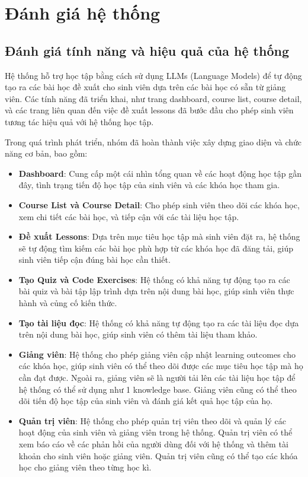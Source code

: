 \chapter{Đánh giá hệ thống}

\section{Đánh giá tính năng và hiệu quả của hệ thống}

Hệ thống hỗ trợ học tập bằng cách sử dụng LLMs (Language Models) để tự động tạo ra các bài học đề xuất cho sinh viên dựa trên các bài học có sẵn từ giảng viên. Các tính năng đã triển khai, như trang dashboard, course list, course detail, và các trang liên quan đến việc đề xuất lessons đã bước đầu cho phép sinh viên tương tác hiệu quả với hệ thống học tập.

Trong quá trình phát triển, nhóm đã hoàn thành việc xây dựng giao diện và chức năng cơ bản, bao gồm:

\begin{itemize}
    \item \textbf{Dashboard}: Cung cấp một cái nhìn tổng quan về các hoạt động học tập gần đây, tình trạng tiến độ học tập của sinh viên và các khóa học tham gia.
    \item \textbf{Course List và Course Detail}: Cho phép sinh viên theo dõi các khóa học, xem chi tiết các bài học, và tiếp cận với các tài liệu học tập.
    \item \textbf{Đề xuất Lessons}: Dựa trên mục tiêu học tập mà sinh viên đặt ra, hệ thống sẽ tự động tìm kiếm các bài học phù hợp từ các khóa học đã đăng tải, giúp sinh viên tiếp cận đúng bài học cần thiết.
    \item \textbf{Tạo Quiz và Code Exercises}: Hệ thống có khả năng tự động tạo ra các bài quiz và bài tập lập trình dựa trên nội dung bài học, giúp sinh viên thực hành và củng cố kiến thức.
    \item \textbf{Tạo tài liệu đọc}: Hệ thống có khả năng tự động tạo ra các tài liệu đọc dựa trên nội dung bài học, giúp sinh viên có thêm tài liệu tham khảo.
    \item \textbf{Giảng viên}: Hệ thống cho phép giảng viên cập nhật learning outcomes cho các khóa học, giúp sinh viên có thể theo dõi được các mục tiêu học tập mà họ cần đạt được. Ngoài ra, giảng viên sẽ là người tải lên các tài liệu học tập để hệ thống có thể sử dụng như 1 knowledge base. Giảng viên cũng có thể theo dõi tiến độ học tập của sinh viên và đánh giá kết quả học tập của họ.
    \item \textbf{Quản trị viên}: Hệ thống cho phép quản trị viên theo dõi và quản lý các hoạt động của sinh viên và giảng viên trong hệ thống. Quản trị viên có thể xem báo cáo về các phản hồi của người dùng đối với hệ thống và thêm tài khoản cho sinh viên hoặc giảng viên. Quản trị viên cũng có thể tạo các khóa học cho giảng viên theo từng học kì. 
\end{itemize}


